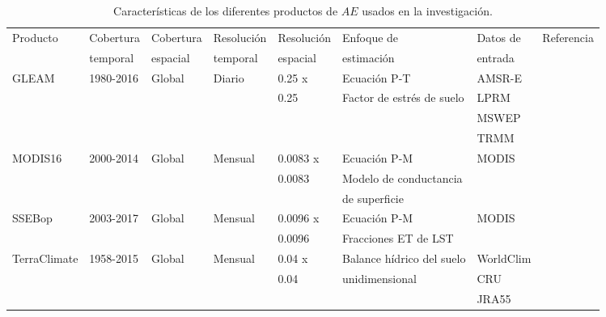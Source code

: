 \begin{sidewaystable}
\caption{\label{tab:ETproducts} Características de los diferentes productos de $AE$ usados en la investigación.}
\centering
\begin{tabular}{llllllll}
\hline 
Producto     & Cobertura & Cobertura & Resolución & Resolución & Enfoque de                & Datos de   & Referencia      \\
             & temporal  & espacial  & temporal   & espacial   & estimación                & entrada    &                 \\   \hline
GLEAM        & 1980-2016 & Global    & Diario     & 0.25 x     & Ecuación P-T              & AMSR-E     & \citet{Martens2017}     \\
             &           &           &            & 0.25       & Factor de estrés de suelo & LPRM       &                 \\
             &           &           &            &            &                           & MSWEP     &                 \\
             &           &           &            &            &                           & TRMM       &                 \\
MODIS16      & 2000-2014 & Global    & Mensual    & 0.0083 x   & Ecuación P-M              & MODIS      & \citet{mu2013modis}         \\
             &           &           &            & 0.0083     & Modelo de conductancia    &            &                 \\
             &           &           &            &            & de superficie             &            &                 \\
SSEBop       & 2003-2017 & Global    & Mensual    & 0.0096 x   & Ecuación P-M              & MODIS      & \citet{senay2011enhancing}      \\
             &           &           &            & 0.0096     & Fracciones ET de LST      &            &                 \\
TerraClimate & 1958-2015 & Global    & Mensual    & 0.04 x     & Balance hídrico del suelo & WorldClim  & \citet{abatzoglou2018terraclimate} \\
             &           &           &            & 0.04       & unidimensional            & CRU        &                 \\
             &           &           &            &            &                           & JRA55      &                 \\

\end{tabular}
\end{sidewaystable}
